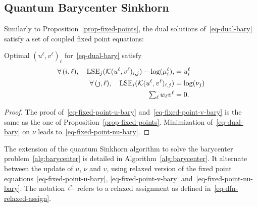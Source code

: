 \subsection{Quantum Barycenter Sinkhorn}

Similarly to Proposition~\ref{prop-fixed-points}, the dual solutions of~\eqref{eq-dual-bary} satisfy a set of coupled fixed point equations:


\begin{prop}
Optimal $(u^\ell,v^\ell)_\ell$ for~\eqref{eq-dual-bary} satisfy 
\begin{align}
	\forall \, (i,\ell), \quad \operatorname{LSE}_j(\mathcal{K}(u^\ell,v^\ell)_{i,j})-\log(\mu_i^\ell), \label{eq-fixed-point-u-bary} 
		&= u_i^\ell \\
	\forall \, (j,\ell), \quad \operatorname{LSE}_i(\mathcal{K}(u^\ell,v^\ell)_{i,j}) \label{eq-fixed-point-v-bary}
		&= \log(\nu_j)\\ 
		 \textstyle \sum_\ell w_\ell v^\ell &= 0. \label{eq-fixed-point-nu-bary}
\end{align}
\end{prop}
\begin{proof}
The proof of~\eqref{eq-fixed-point-u-bary} and~\eqref{eq-fixed-point-v-bary} is the same as the one of Proposition~\ref{prop-fixed-points}.
Minimization of~\eqref{eq-dual-bary} on $\nu$ leads to~\eqref{eq-fixed-point-nu-bary}. 
\end{proof}

The extension of the quantum Sinkhorn algorithm to solve the barycenter problem~\eqref{alg:barycenter} is detailed in Algorithm~\ref{alg:barycenter}. It alternate between the update of $u$, $\nu$ and $v$, using relaxed version of the fixed point equations~\eqref{eq-fixed-point-u-bary}, \eqref{eq-fixed-point-v-bary} and~\eqref{eq-fixed-point-nu-bary}. The notation $\overset{\;\tau}{\leftarrow}$ refers to a relaxed assignment as defined in~\eqref{eq-dfn-relaxed-assign}. 

